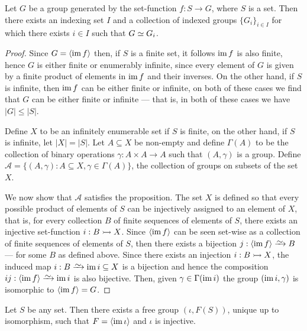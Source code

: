 \begin{lemma}\label{lem:isomorphism-indexing-set-group}
Let \(G\) be a group generated by the set-function \(f: S \to G\), where
\(S\) is a set. Then there exists an indexing set \(I\) and a collection of
indexed groups \(\{G_i\}_{i \in I}\) for which there exists \(i \in I\) such
that \(G \simeq G_i\).
\end{lemma}

\begin{proof} Since \(G = \left\langle \operatorname{im} f \right\rangle\) then, if \(S\) is a
finite set, it follows \(\operatorname{im} f\) is also finite, hence \(G\) is either finite or
enumerably infinite, since every element of \(G\) is given by a finite product
of elements in \(\operatorname{im} f\) and their inverses. On the other hand, if \(S\) is
infinite, then \(\operatorname{im} f\) can be either finite or infinite, on both of these
cases we find that \(G\) can be either finite or infinite --- that is, in both
of these cases we have \(|G| \leq |S|\).

Define \(X\) to be an infinitely enumerable set if \(S\) is finite, on the other
hand, if \(S\) is infinite, let \(|X| = |S|\). Let \(A \subseteq X\) be
non-empty and define \(\Gamma(A)\) to be the collection of binary operations
\(\gamma: A \times A \to A\) such that \((A, \gamma)\) is a group. Define
\(\mathcal{A} = \{(A, \gamma) \colon A \subseteq X, \gamma \in \Gamma(A)\}\), the
collection of groups on subsets of the set \(X\).

We now show that \(\mathcal{A}\) satisfies the proposition. The set \(X\) is
defined so that every possible product of elements of \(S\) can be injectively
assigned to an element of \(X\), that is, for every collection \(B\) of finite
sequences of elements of \(S\), there exists an injective set-function \(i: B
\rightarrowtail X\). Since \(\left\langle \operatorname{im} f \right\rangle\) can be seen set-wise as a
collection of finite sequences of elements of \(S\), then there exists a
bijection \(j: \left\langle \im f \right\rangle \isoto B\) --- for some \(B\) as
defined above. Since there exists an injection \(i: B \rightarrowtail X\), the induced map
\(i: B \isoto \im i \subseteq X\) is a bijection and hence the composition \(ij:
\left\langle \im f \right\rangle \isoto \im i\) is also bijective. Then, given
\(\gamma \in \Gamma(\operatorname{im} i)\) the group \((\operatorname{im} i, \gamma)\) is isomorphic to
\(\left\langle \operatorname{im} f \right\rangle = G\).
\end{proof}

\begin{proposition}
\label{prop:universal-free-group}
Let \(S\) be any set. Then there exists a free group \((\iota, F(S))\), unique
up to isomorphism, such that \(F = \left\langle \operatorname{im} \iota \right\rangle\) and
\(\iota\) is injective.
\end{proposition}

